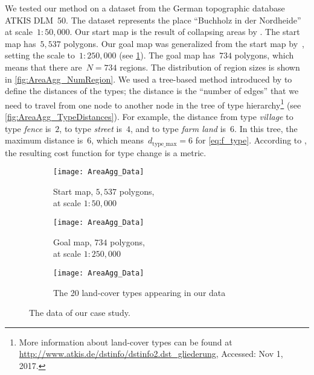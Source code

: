 \documentclass[acmsmall,natbib=false]{acmart}
\begin{document}
We tested our method on a dataset 
from the German topographic database ATKIS DLM~50. 
The dataset represents the place 
``Buchholz in der Nordheide'' at scale~$1:50{,}000$. 
Our start map is the result of collapsing areas 
by \citet[]{haunert2008f}.
The start map has~$5{,}537$ polygons. 
Our goal map was generalized from the start map 
by~\citet{HaunertWolff2010AreaAgg}, setting the scale 
to~$1:250{,}000$ (see \fig\ref{fig:AreaAgg_Data}). 
The goal map has~$734$ polygons, 
which means that there are~$N=734$ regions.
The distribution of region sizes is shown in 
\fig\ref{fig:AreaAgg_NumRegion}.
%
We used a tree-based method introduced by 
\citet{Rada1989SemanticMetric} 
to define the distances of the types;
the distance is the ``number of edges'' that
we need to travel from one node to another node in the tree of 
type hierarchy\footnote{More information 
    about land-cover types can be found at 
	\url{http://www.atkis.de/dstinfo/dstinfo2.dst_gliederung},
	Accessed: Nov 1, 2017.}
(see \fig\ref{fig:AreaAgg_TypeDistances}). 
For example, the distance from type \emph{village}
to type \emph{fence} is~$2$, 
to type \emph{street} is~$4$, and
to type \emph{farm land} is~$6$.
In this tree, the maximum distance is~$6$, 
which means~$d_\mathrm{type\_max}=6$ for \eq\ref{eq:f_type}.
According to \citet{Rada1989SemanticMetric}, 
the resulting cost function for type change is a metric.


\begin{figure}[tb]
\begin{subfigure}[b]{.49\textwidth}
\centering
\texttt{[image: AreaAgg\_Data]}
\caption{Start map, $5{,}537$ polygons, \\
	at scale $1:50{,}000$}
\end{subfigure}
\hfill
\begin{subfigure}[b]{.49\textwidth}
\centering
\texttt{[image: AreaAgg\_Data]}
\caption{Goal map, $734$ polygons, \\
	at scale $1:250{,}000$}
\end{subfigure}

\bigskip
\bigskip

\begin{subfigure}{\textwidth}
\centering
\texttt{[image: AreaAgg\_Data]}
\caption{The 20 land-cover types appearing in our data}
\end{subfigure}
\caption{The data of our case study.}
\label{fig:AreaAgg_Data}
\end{figure}
\end{document}
